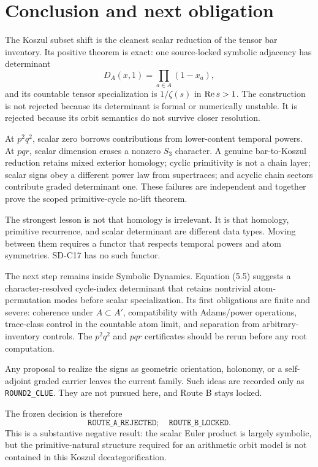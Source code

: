 \section{Conclusion and next obligation}
\label{sec:conclusion}

The Koszul subset shift is the cleanest scalar reduction of the tensor bar
inventory.  Its positive theorem is exact: one source-locked symbolic
adjacency has determinant
\[
  D_A(x,1)=\prod_{a\in A}(1-x_a),
\]
and its countable tensor specialization is $1/\zeta(s)$ in
$\operatorname{Re} s>1$.  The construction is not rejected because its determinant is
formal or numerically unstable.  It is rejected because its orbit semantics
do not survive closer resolution.

At $p^2q^2$, scalar zero borrows contributions from lower-content temporal
powers.  At $pqr$, scalar dimension erases a nonzero $S_3$ character.  A
genuine bar-to-Koszul reduction retains mixed exterior homology; cyclic
primitivity is not a chain layer; scalar signs obey a different power law
from supertraces; and acyclic chain sectors contribute graded determinant
one.  These failures are independent and together prove the scoped
primitive-cycle no-lift theorem.

The strongest lesson is not that homology is irrelevant.  It is that
homology, primitive recurrence, and scalar determinant are different data
types.  Moving between them requires a functor that respects temporal powers
and atom symmetries.  SD-C17 has no such functor.

The next step remains inside Symbolic Dynamics.  Equation (5.5) suggests a
character-resolved cycle-index determinant that retains nontrivial
atom-permutation modes before scalar specialization.  Its first obligations
are finite and severe: coherence under $A\subset A'$, compatibility with
Adams/power operations, trace-class control in the countable atom limit, and
separation from arbitrary-inventory controls.  The $p^2q^2$ and $pqr$
certificates should be rerun before any root computation.

Any proposal to realize the signs as geometric orientation, holonomy, or a
self-adjoint graded carrier leaves the current family.  Such ideas are
recorded only as \texttt{ROUND2\_CLUE}.  They are not pursued here, and Route B stays
locked.

The frozen decision is therefore
\[
\boxed{\texttt{ROUTE\_A\_REJECTED};\quad
       \texttt{ROUTE\_B\_LOCKED}.}
\]
This is a substantive negative result: the scalar Euler product is largely
symbolic, but the primitive-natural structure required for an arithmetic
orbit model is not contained in this Koszul decategorification.
